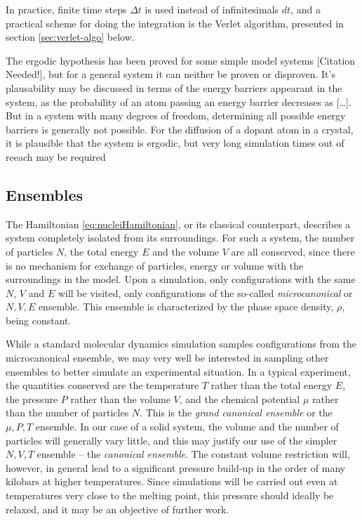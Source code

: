 \documentclass[11pt,bibliography=totoc,index=totoc]{scrbook}   %
\begin{document}
In practice, finite time steps $\Delta t$ is used instead of infinitesimals $dt$, and a practical scheme for doing
the integration is the Verlet algorithm, presented in section \ref{sec:verlet-algo} below.

The ergodic hypothesis has been proved for some simple model systems [Citation Needed!], 
but for a general system it can neither be proven or disproven. 
It's plausability may be discussed in terms of the energy barriers appearant in the system,
as the probability of an atom passing an energy barrier decreases as [\ldots]. 
But in a system with many degrees of freedom, determining all possible energy barriers is generally not possible.
For the diffusion of a dopant atom in a crystal, it is plausible that the system is ergodic, but very long
simulation times out of reeach may be required


%
\subsection{Ensembles}
%

The Hamiltonian \eqref{eq:nucleiHamiltonian}, or its classical counterpart, describes a system completely isolated from its surroundings.
For such a system, the number of particles $N$, the total energy $E$ and the volume $V$ are all conserved, since there is no mechanism for exchange of particles, energy or volume with the surroundings in the model.
Upon a simulation, only configurations with the same $N$, $V$ and $E$ will be visited, only configurations of the so-called \emph{microcanonical} or $N,V,E$ ensemble. This ensemble is characterized by the phase space density, $\rho$, being constant.

While a standard molecular dynamics simulation samples configurations from the microcanonical ensemble, we may very well be interested in sampling other ensembles to better simulate an experimental situation. 
In a typical experiment, the quantities conserved are the temperature $T$ rather than the total energy $E$, the pressure $P$ rather than the volume $V$, and the chemical potential $\mu$ rather than the number of particles $N$. 
This is the \emph{grand canonical ensemble} or the $\mu,P,T$ ensemble. 
In our case of a solid system, the volume and the number of particles will generally vary little, and this may justify our use of the simpler $N,V,T$ ensemble -- the \emph{canonical ensemble}. 
The constant volume restriction will, however, in general lead to a significant pressure build-up in the order of many kilobars at higher temperatures. 
Since simulations will be carried out even at temperatures very close to the melting point, this pressure should ideally be relaxed, and it may be an objective of further work.
\end{document}
